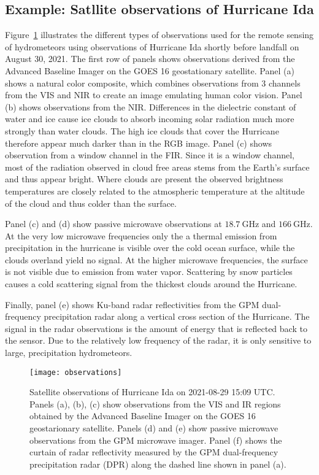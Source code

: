 \subsection{Example: Satllite observations of Hurricane Ida}

Figure~\ref{fig:radiative_transfer:observations} illustrates the different types
of observations used for the remote sensing of hydrometeors using observations
of Hurricane Ida shortly before landfall on August 30, 2021. The first row of
panels shows observations derived from the Advanced Baseline Imager on the GOES
16 geostationary satellite. Panel (a) shows a natural color composite, which
combines observations from 3 channels from the VIS and NIR to create an image
emulating human color vision. Panel (b) shows observations from the NIR.
Differences in the dielectric constant of water and ice cause ice clouds to
absorb incoming solar radiation much more strongly than water clouds. The high
ice clouds that cover the Hurricane therefore appear much darker than in the RGB
image. Panel (c) shows observation from a window channel in the FIR. Since it is
a window channel, most of the radiation observed in cloud free areas stems from
the Earth's surface and thus appear bright. Where clouds are present the
observed brightness temperatures are closely related to the atmospheric
temperature at the altitude of the cloud and thus colder than the surface.

Panel (c) and (d) show passive microwave observations at $\SI{18.7}{\giga
  \hertz}$ and $\SI{166}{\giga \hertz}$. At the very low microwave frequencies
only the a thermal emission from precipitation in the hurricane is visible over
the cold ocean surface, while the clouds overland yield no signal. At the higher
microwave frequencies, the surface is not visible due to emission from water
vapor. Scattering by snow particles causes a cold scattering signal from the
thickest clouds around the Hurricane.

Finally, panel (e) shows Ku-band radar reflectivities from the GPM
dual-frequency precipitation radar along a vertical cross section of the
Hurricane. The signal in the radar observations is the amount of energy that is
reflected back to the sensor. Due to the relatively low frequency of the
radar, it is only sensitive to large, precipitation hydrometeors.


\begin{figure}
  \centering
\texttt{[image: observations]}
\caption{Satellite observations of Hurricane Ida on 2021-08-29 15:09 UTC.
  Panels (a), (b), (c) show observations from the VIS and IR regions obtained
  by the Advanced Baseline Imager on the GOES 16 geostarionary satellite.
  Panels (d) and (e) show passive microwave observations from the GPM microwave
  imager. Panel (f) shows the curtain of radar reflectivity measured by the GPM dual-frequency
  precipitation radar (DPR) along the dashed line shown in panel (a).}
\label{fig:radiative_transfer:observations}
\end{figure}
